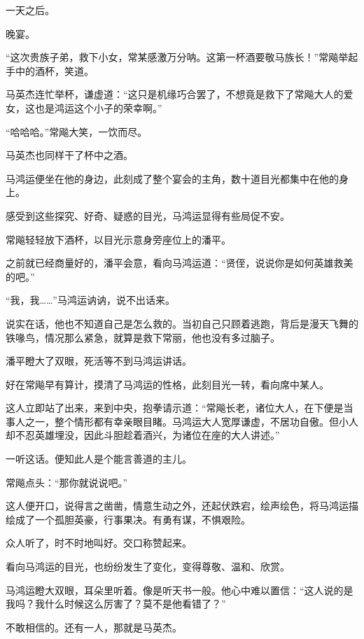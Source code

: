 
\begin{this_body}



一天之后。

晚宴。

“这次贵族子弟，救下小女，常某感激万分呐。这第一杯酒要敬马族长！”常飚举起手中的酒杯，笑道。

马英杰连忙举杯，谦虚道：“这只是机缘巧合罢了，不想竟是救下了常飚大人的爱女，这也是鸿运这个小子的荣幸啊。”

“哈哈哈。”常飚大笑，一饮而尽。

马英杰也同样干了杯中之酒。

马鸿运便坐在他的身边，此刻成了整个宴会的主角，数十道目光都集中在他的身上。

感受到这些探究、好奇、疑惑的目光，马鸿运显得有些局促不安。

常飚轻轻放下酒杯，以目光示意身旁座位上的潘平。

之前就已经商量好的，潘平会意，看向马鸿运道：“贤侄，说说你是如何英雄救美的吧。”

“我，我……”马鸿运讷讷，说不出话来。

说实在话，他也不知道自己是怎么救的。当初自己只顾着逃跑，背后是漫天飞舞的铁喙鸟，情况那么紧急，就算是救下常丽，他也没有多过脑子。

潘平瞪大了双眼，死活等不到马鸿运讲话。

好在常飚早有算计，摸清了马鸿运的性格，此刻目光一转，看向席中某人。

这人立即站了出来，来到中央，抱拳请示道：“常飚长老，诸位大人，在下便是当事人之一，整个情形都有幸亲眼目睹。马鸿运大人宽厚谦虚，不居功自傲。但小人却不忍英雄埋没，因此斗胆趁着酒兴，为诸位在座的大人讲述。”

一听这话。便知此人是个能言善道的主儿。

常飚点头：“那你就说说吧。”

这人便开口，说得言之凿凿，情意生动之外，还起伏跌宕，绘声绘色，将马鸿运描绘成了一个孤胆英豪，行事果决。有勇有谋，不惧艰险。

众人听了，时不时地叫好。交口称赞起来。

看向马鸿运的目光，也纷纷发生了变化，变得尊敬、温和、欣赏。

马鸿运瞪大双眼，耳朵里听着。像是听天书一般。他心中难以置信：“这人说的是我吗？我什么时候这么厉害了？莫不是他看错了？”

不敢相信的。还有一人，那就是马英杰。


\end{this_body}
